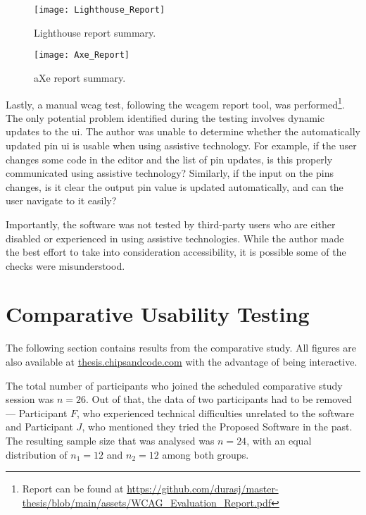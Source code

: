 \begin{figure}[H]
    \texttt{[image: Lighthouse\_Report]}
    \caption{Lighthouse report summary.}
    \label{fig:lighthouse-report}
\end{figure}

\begin{figure}[H]
    \texttt{[image: Axe\_Report]}
    \caption{aXe report summary.}
    \label{fig:axe-report}
\end{figure}

Lastly, a manual \gls{wcag} test, following the \gls{wcagem} report tool, was performed\footnote{Report can be found at \url{https://github.com/durasj/master-thesis/blob/main/assets/WCAG_Evaluation_Report.pdf}}.
The only potential problem identified during the testing involves dynamic updates to the \gls{ui}.
The author was unable to determine whether the automatically updated pin \gls{ui} is usable when using assistive technology.
For example, if the user changes some code in the editor and the list of pin updates, is this properly communicated using assistive technology?
Similarly, if the input on the pins changes, is it clear the output pin value is updated automatically, and can the user navigate to it easily?

Importantly, the software was not tested by third-party users who are either disabled or experienced in using assistive technologies.
While the author made the best effort to take into consideration accessibility, it is possible some of the checks were misunderstood.

\section{Comparative Usability Testing}
\label{Evaluation-UX}

The following section contains results from the comparative study.
All figures are also available at \href{https://thesis.chipsandcode.com}{thesis.chipsandcode.com} with the advantage of being interactive.

The total number of participants who joined the scheduled comparative study session was $n=26$.
Out of that, the data of two participants had to be removed --- Participant $F$, who experienced technical difficulties unrelated to the software and Participant $J$, who mentioned they tried the Proposed Software in the past.
The resulting sample size that was analysed was $n=24$, with an equal distribution of $n_1=12$ and $n_2=12$ among both groups.

